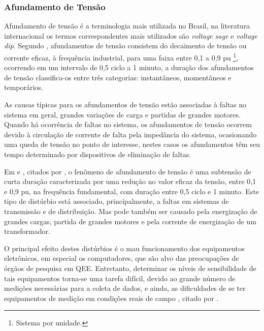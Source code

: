 \subsubsection{Afundamento de Tensão}
\par 
Afundamento de tensão é a terminologia mais utilizada no Brasil, na literatura internacional os termos correspondentes mais utilizados são \textit{voltage sage} e \textit{voltage dip}. Segundo \cite{FER99}, afundamentos de tensão consistem do decaimento de tensão ou corrente eficaz, à frequência industrial, para uma faixa entre 0,1 a 0,9 pu \footnote{Sistema por unidade.}, ocorrendo em um intervalo de 0,5 ciclo a 1 minuto, a duração dos afundamentos de tensão classifica-os entre três categorias: instantâneos, momentâneos e temporários.
\par 
As causas típicas para os afundamentos de tensão estão associadas à faltas no sistema em geral, grandes variações de carga e partidas de grandes motores. Quando há ocorrência de faltas no sistema, os afundamentos de tensão ocorrem devido à circulação de corrente de falta pela impedância do sistema, ocasionando uma queda de tensão no ponto de interesse, nestes casos os afundamentos têm seu tempo determinado por dispositivos de eliminação de faltas.
\par
Em \cite{OLIVE} e \cite{SIL01}, citados por \cite{DEL03}, o fenômeno de afundamento de tensão é uma subtensão de curta duração caracterizada por uma redução no valor eficaz da tensão, entre 0,1 e 0,9 pu, na frequência fundamental, com duração entre 0,5 ciclo e 1 minuto. Este tipo de distúrbio está associado, principalmente, a faltas em sistemas de transmissão e de distribuição. Mas pode também ser causado pela energização de grandes cargas, partida de grandes motores e pela corrente de energização de um transformador.
\par
O principal efeito destes distúrbios é o mau funcionamento dos equipamentos eletrônicos, em especial os computadores, que são alvo das preocupações de órgãos de pesquisa em \ac{QEE}. Entretanto, determinar os níveis de sensibilidade de tais equipamentos torna-se uma tarefa difícil, devido ao grande número de medições necessárias para a coleta de dados, e ainda, as dificuldades de se ter equipamentos de medição em condições reais de campo \cite{OLIVE}, citado por \cite{DEL03}.

